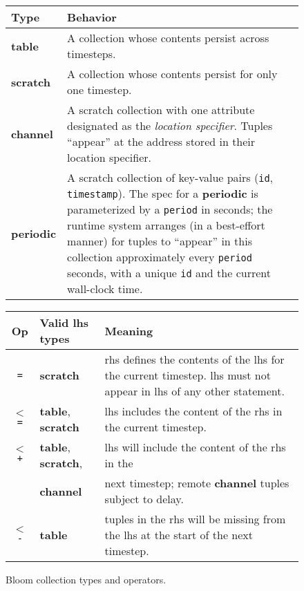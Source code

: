 \begin{figure}
	\begin{small}
	\begin{tabular}{|l|p{2.55in}|}
		\hline
		Type & Behavior\\
		\hline
		\textbf{table} & A collection whose contents persist across timesteps.\\
		\textbf{scratch} & A collection whose contents persist for only one timestep.\\
		\textbf{channel} & A scratch collection with one attribute designated as the {\em location specifier}. Tuples ``appear'' at the address stored in their location specifier.\\
		\textbf{periodic} & A scratch collection of key-value pairs (\texttt{id}, \texttt{timestamp}).  The spec for a \textbf{periodic} is parameterized by a \texttt{period} in seconds; the runtime system arranges (in a best-effort manner) for tuples to ``appear'' in this collection approximately every \texttt{period} seconds, with a unique \texttt{id} and the current wall-clock time.\\
		\hline
	\end{tabular}

	\vspace{2em}
	
	\begin{tabular}{|c|l|p{2in}|}
		\hline
		Op & Valid lhs types & Meaning\\
				\hline 
		\texttt{=} & \textbf{scratch} & rhs defines the contents of the lhs for the current timestep.  lhs must not appear in lhs of any other statement.\\
		\texttt{$<$=} & \textbf{table}, \textbf{scratch} & lhs includes the content of the rhs in the current timestep.\\
		\texttt{$<$+} & \textbf{table}, \textbf{scratch}, & lhs will include the content of the rhs in the\\
		              & \textbf{channel} &  next timestep; remote \textbf{channel} tuples subject to delay.\\
		\texttt{$<$-} & \textbf{table} & tuples in the rhs will be missing from the lhs at the start of  the next timestep.\\
		\hline
	\end{tabular}
	\end{small}
	\caption{Bloom collection types and operators.}
	\label{tab:bloom}
\end{figure}

